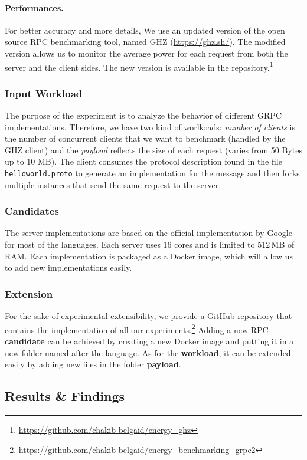 \paragraph{Performances.}
For better accuracy and more details, We use an updated version of the open source RPC benchmarking tool, named GHZ (\url{https://ghz.sh/}).
The modified version allows us to monitor the average power for each request from both the server and the client sides.
The new version is available in the repository.\footnote{\url{https://github.com/chakib-belgaid/energy_ghz}}

\subsubsection{Input Workload}
The purpose of the experiment is to analyze the behavior of different GRPC implementations.
Therefore, we have two kind of worlkoads: \emph{number of clients} is the number of concurrent clients that we want to benchmark (handled by the GHZ client) and the \emph{payload} reflects the size of each request (varies from 50 Bytes up to 10 MB).
The client consumes the protocol description found in the file \texttt{helloworld.proto} to generate an implementation for the message and then forks multiple instances that send the same request to the server.

\subsubsection*{Candidates}
The server implementations are based on the official implementation by Google for most of the languages.
Each server uses 16 cores and is limited to 512\,MB of RAM.
Each implementation is packaged as a Docker image, which will allow us to add new implementations easily.

\subsubsection{Extension}
For the sake of experimental extensibility, we provide a GitHub repository that contains the implementation of all our experiments.\footnote{\url{https://github.com/chakib-belgaid/energy_benchmarking_grpc2}}
Adding a new RPC \textbf{candidate} can be achieved by creating a new Docker image and putting it in a new folder named after the language.
As for the \textbf{workload}, it can be extended easily by adding new files in the folder \textbf{payload}.


\subsection{Results \& Findings}
